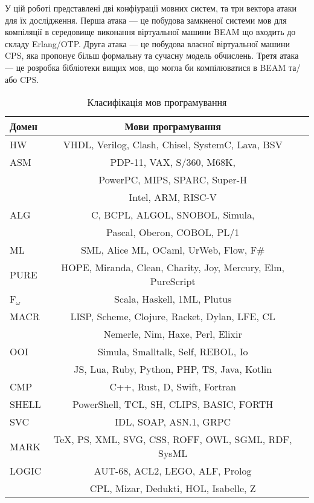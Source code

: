 У цій роботі представлені дві конфіурації мовних систем, та три вектора атаки для їх дослідження.
Перша атака --- це побудова замкненої системи мов для компіляції в середовище виконання віртуальної машини BEAM що входить до складу Erlang/OTP.
Друга атака --- це побудова власної віртуальної машини CPS, яка пропонує більш формальну та сучасну модель обчислень.
Третя атака --- це розробка бібліотеки вищих мов, що могла би компілюватися в BEAM та/або CPS.

\begin{table}[ht]
 \caption{Класифікація мов програмування}
  \begin{tabular}{lcc}
   \hline
       \textbf{Домен} & \textbf{Мови програмування} \\
    \hline
       HW & VHDL, Verilog, Clash, Chisel, SystemC, Lava, BSV \\
    \hline
       ASM & PDP-11, VAX, S/360, M68K,  \\
           & PowerPC, MIPS, SPARC, Super-H \\
           & Intel, ARM, RISC-V \\
    \hline
       ALG & C, BCPL, ALGOL, SNOBOL, Simula, \\
           & Pascal, Oberon, COBOL, PL/1 \\
    \hline
       ML & SML, Alice ML, OCaml, UrWeb, Flow, F\# \\
    \hline
       PURE & HOPE, Miranda, Clean, Charity, Joy, Mercury, Elm, PureScript \\
    \hline
       F$_\omega$ & Scala, Haskell, 1ML, Plutus \\
    \hline
       MACR & LISP, Scheme, Clojure, Racket, Dylan, LFE, CL \\
            & Nemerle, Nim, Haxe, Perl, Elixir \\
    \hline
       OOI & Simula, Smalltalk, Self, REBOL, Io \\
           & JS, Lua, Ruby, Python, PHP, TS, Java, Kotlin \\
    \hline
       CMP & C++, Rust, D, Swift, Fortran \\
    \hline
       SHELL & PowerShell, TCL, SH, CLIPS, BASIC, FORTH \\
    \hline
       SVC & IDL, SOAP, ASN.1, GRPC \\
    \hline
       MARK & TeX, PS, XML, SVG, CSS, ROFF, OWL, SGML, RDF, SysML \\
    \hline
       LOGIC & AUT-68, ACL2, LEGO, ALF, Prolog \\
             & CPL, Mizar, Dedukti, HOL, Isabelle, Z \\

\end{tabular}
\end{table}
